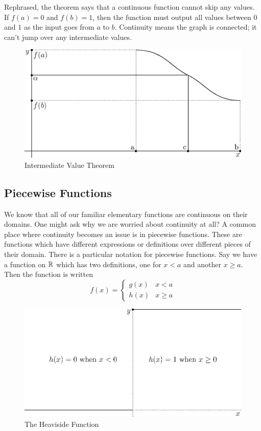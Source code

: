 \documentclass[fleqn]{report}
\begin{document}
Rephrased, the theorem says that a continuous function cannot
skip any values. If $f(a) = 0$ and $f(b) = 1$, then the
function must output all values between $0$ and $1$ as the
input goes from $a$ to $b$. Continuity means the graph is
connected; it can't jump over any intermediate values.

\begin{figure}[t]
\centering
\includegraphics[width=12cm]{figure46.eps}
\caption{Intermediate Value Theorem}
\label{figure-ivt}
\end{figure}

\subsection{Piecewise Functions}
\label{piecewise}

We know that all of our familiar elementary functions are
continuous on their domains. One might ask why we are worried
about continuity at all? A common place where continuity
becomes an issue is in piecewise functions. These are
functions which have different expressions or definitions over
different pieces of their domain. There is a particular
notation for piecewise functions. Say we have a function on
$\mathbb{R}$ which has two definitions, one for $x<a$ and another $x
\geq a$. Then the function is written
\begin{equation*}
f(x) = \left\{ \begin{matrix} g(x) & x < a \\ h(x) & x \geq a
\end{matrix} \right.
\end{equation*}

\begin{figure}[t]
\centering
\includegraphics[width=12cm]{figure21.eps}
\caption{The Heaviside Function}
\label{figure-heaviside}
\end{figure}
\end{document}
